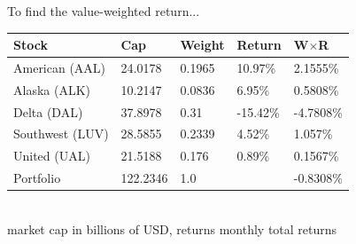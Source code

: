 To find the value-weighted return...
\begin{center}
	{\color{blue}
	\begin{tabular}{l|llll}
		\textbf{Stock} & \textbf{Cap} & \textbf{W}eight & \textbf{R}eturn & \textbf{W$\times$R}\\ \hline
		American (AAL) & 24.0178 & 0.1965 & 10.97\% & 2.1555\% \\
		Alaska (ALK) & 10.2147 & 0.0836 & 6.95\% & 0.5808\% \\
		Delta (DAL) & 37.8978 & 0.31 & -15.42\% & -4.7808\% \\
		Southwest (LUV) & 28.5855 & 0.2339 & 4.52\% & 1.057\% \\
		United (UAL) & 21.5188 & 0.176 & 0.89\% & 0.1567\% \\ \hline 
		Portfolio & 122.2346 & 1.0 & & -0.8308\%\\\hline
	\end{tabular}
	}\\
	{\footnotesize market cap in billions of USD, returns monthly total returns}
\end{center}